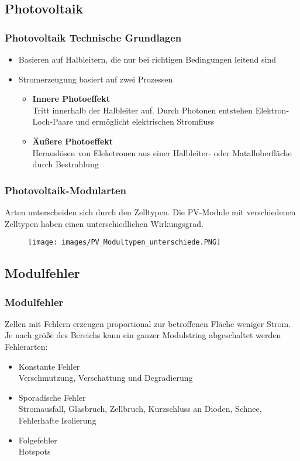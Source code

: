 \documentclass[utf8x, xcolor=dvipsnames]{beamer}
\begin{document}
\subsection{Photovoltaik}

\begin{frame}
\frametitle{Photovoltaik Technische Grundlagen}
\begin{itemize}
	\item Basieren auf Halbleitern, die nur bei richtigen Bedingungen leitend sind
	\item Stromerzeugung basiert auf zwei Prozessen
	\begin{itemize}
		\item \textbf{Innere Photoeffekt}\\
			  Tritt innerhalb der Halbleiter auf. Durch Photonen entstehen Elektron-Loch-Paare und ermöglicht elektrischen Stromfluss
		\item \textbf{Äußere Photoeffekt}\\
		 	  Herauslösen von Eleketronen aus einer Halbleiter- oder Matalloberfläche durch Bestrahlung
	\end{itemize}
\end{itemize}
\end{frame}

\begin{frame}
\frametitle{Photovoltaik-Modularten}
Arten unterscheiden sich durch den Zelltypen. Die PV-Module mit verschiedenen Zelltypen haben einen unterschiedlichen Wirkungsgrad. 
\begin{figure}
	\texttt{[image: images/PV\_Modultypen\_unterschiede.PNG]}
\end{figure}
\end{frame}

\subsection{Modulfehler}

\begin{frame}
\frametitle{Modulfehler}
Zellen mit Fehlern erzeugen proportional zur betroffenen Fläche weniger Strom. Je nach größe des Bereichs kann ein ganzer Modulstring abgeschaltet werden\\
Fehlerarten: 
\begin{itemize}
	\item Konstante Fehler\\
		  Verschmutzung, Verschattung und Degradierung
	\item Sporadische Fehler\\
		  Stromausfall, Glasbruch, Zellbruch, Kurzschluss an Dioden, Schnee, Fehlerhafte Isolierung
	\item Folgefehler \\
		  Hotspots
\end{itemize}
\end{frame}
\end{document}
